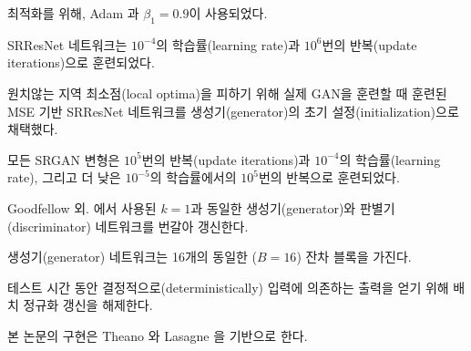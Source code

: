 \documentclass[10pt,twocolumn,letterpaper]{article}
\newcommand{\kor}[1]{#1}
\newcommand{\eng}[1]{}
\begin{document}
\eng{
For optimization we use Adam \cite{Kingma2014} with $\beta_1=0.9$.
}\kor{
최적화를 위해, Adam \cite{Kingma2014}과 $\beta_1=0.9$이 사용되었다.
} \eng{
The SRResNet networks were trained with a learning rate of $10^{-4}$ and $10^{6}$ update iterations.
}\kor{
SRResNet 네트워크는 $10^{-4}$의 학습률(learning rate)과 $10^{6}$번의 반복(update iterations)으로 훈련되었다.
} \eng{
We employed the trained \ac{MSE}-based SRResNet network as initialization for the generator when training the actual \ac{GAN} to avoid undesired local optima.
}\kor{
원치않는 지역 최소점(local optima)을 피하기 위해 실제 \ac{GAN}을 훈련할 때 훈련된 \ac{MSE} 기반 SRResNet 네트워크를 생성기(generator)의 초기 설정(initialization)으로 채택했다.
}
\eng{
All SRGAN variants were trained with $10^5$ update iterations at a learning rate of $10^{-4}$ and another $10^5$ iterations at a lower rate of $10^{-5}$.
}\kor{
모든 SRGAN 변형은 $10^5$번의 반복(update iterations)과 $10^{-4}$의 학습률(learning rate), 그리고 더 낮은 $10^{-5}$의 학습률에서의 $10^5$번의 반복으로 훈련되었다.
}
\eng{
We alternate updates to the generator and discriminator network, which is equivalent to $k=1$ as used in Goodfellow et al. \cite{Goodfellow14GAN}.
}\kor{
Goodfellow 외. \cite{Goodfellow14GAN}에서 사용된 $k=1$과 동일한 생성기(generator)와 판별기(discriminator) 네트워크를 번갈아 갱신한다.
} \eng{
Our generator network has 16 identical ($B=16$) residual blocks.
}\kor{
생성기(generator) 네트워크는 16개의 동일한 ($B=16$) 잔차 블록을 가진다.
} \eng{
During test time we turn batch-normalization update off to obtain an output that deterministically depends only on the input \cite{Ioffe2015}.
}\kor{
테스트 시간 동안 결정적으로(deterministically) 입력\cite{Ioffe2015}에 의존하는 출력을 얻기 위해 배치 정규화 갱신을 해제한다.
} \eng{
Our implementation is based on Theano \cite{theano2016} and Lasagne \cite{lasagne2015}.
}\kor{
본 논문의 구현은 Theano \cite{theano2016}와 Lasagne \cite{lasagne2015}을 기반으로 한다.
}
\end{document}

